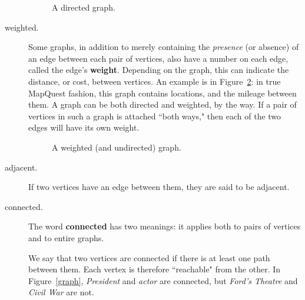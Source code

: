 \begin{description}
\begin{figure}[ht]
\centering
\caption{A directed graph.}
\label{directedGraph}
\end{figure}

\item[weighted.] Some graphs, in addition to merely containing the
\textit{presence} (or absence) of an edge between each pair of vertices,
also have a number on each edge, called the edge's \textbf{weight}.
Depending on the graph, this can indicate the distance, or cost, between
vertices. An example is in Figure~\ref{weightedGraph}: in true MapQuest
fashion, this graph contains locations, and the mileage between them. A
graph can be both directed and weighted, by the way. If a pair of vertices
in such a graph is attached ``both ways," then each of the two edges will
have its own weight.

\begin{figure}[ht]
\centering
\caption{A weighted (and undirected) graph.}
\label{weightedGraph}
\end{figure}

\item[adjacent.] If two vertices have an edge between them, they are said
to be adjacent.

\item[connected.] The word \textbf{connected} has two meanings: it applies
both to pairs of vertices and to entire graphs.

We say that two vertices are connected if there is at least one path
between them. Each vertex is therefore ``reachable" from the other.  In
Figure~\ref{graph}, \textsl{President} and \textsl{actor} are connected,
but \textsl{Ford's Theatre} and \textsl{Civil War} are not.


\end{description}
